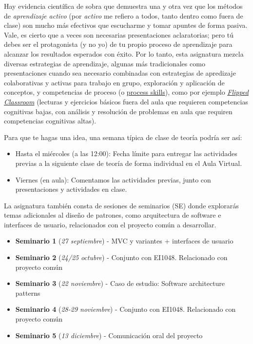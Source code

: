 \documentclass[
  letterpaper,
  DIV=11,
  numbers=noendperiod]{scrartcl}
\begin{document}
Hay evidencia científica de sobra que demuestra una y otra vez que los
métodos de \emph{aprendizaje activo} (por \emph{activo} me refiero a
todos, tanto dentro como fuera de clase) son mucho más efectivos que
escucharme y tomar apuntes de forma pasiva. Vale, es cierto que a veces
son necesarias presentaciones aclaratorias; pero tú debes ser el
protagonista (y no yo) de tu propio proceso de aprendizaje para alcanzar
los resultados esperados con éxito. Por lo tanto, esta asignatura mezcla
diversas estrategias de aprendizaje, algunas más tradicionales como
presentaciones cuando sea necesario combinadas con estrategias de
apredizaje colaborativas y activas para trabajo en grupo, exploración y
aplicación de conceptos, y competencias de proceso (o
\href{http://elipss.com/process-skills.html}{process skills}), como por
ejemplo \href{https://www.theflippedclassroom.es/}{\emph{Flipped
Classroom}} (lecturas y ejercicios básicos fuera del aula que requieren
competencias cognitivas bajas, con análisis y resolución de problemas en
aula que requiren competencias cognitivas altas).

Para que te hagas una idea, una semana típica de clase de teoría podría
ser así:

\begin{itemize}
\item
  Hasta el miércoles (a las 12:00): Fecha límite para entregar las
  actividades previas a la siguiente clase de teoría de forma individual
  en el Aula Virtual.
\item
  Viernes (en aula): Comentamos las actividades previas, junto con
  presentaciones y actividades en clase.
\end{itemize}

La asignatura también consta de sesiones de seminarios (SE) donde
explorarás temas adicionales al diseño de patrones, como arquitectura de
software e interfaces de usuario, relacionados con el proyecto común a
desarrollar.

\begin{itemize}
\item
  \textbf{Seminario 1} (\emph{27 septiembre}) - MVC y variantes +
  interfaces de usuario
\item
  \textbf{Seminario 2} (\emph{24/25} \emph{octubre}) - Conjunto con
  EI1048. Relacionado con proyecto común
\item
  \textbf{Seminario 3} (\emph{22 noviembre}) - Caso de estudio: Software
  architecture patterns
\item
  \textbf{Seminario 4} (\emph{28-29 noviembre}) - Conjunto con EI1048.
  Relacionado con proyecto común
\item
  \textbf{Seminario 5} (\emph{13 diciembre}) - Comunicación oral del
  proyecto
\end{itemize}
\end{document}
